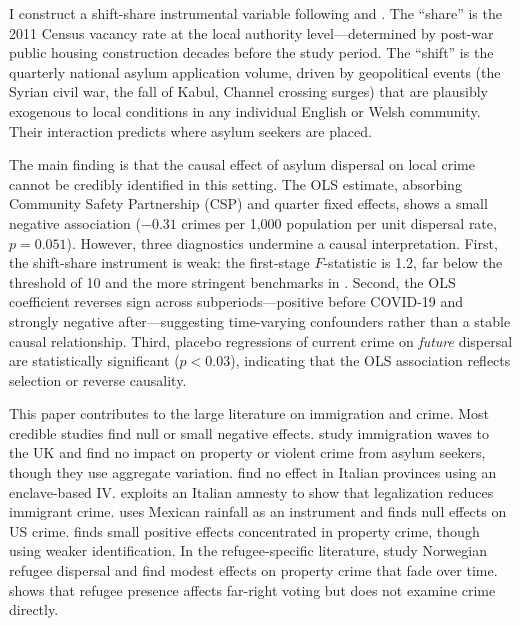 \documentclass[12pt]{article}
\begin{document}
I construct a shift-share instrumental variable following \citet{goldsmith2020bartik} and \citet{borusyak2022quasi}. The ``share'' is the 2011 Census vacancy rate at the local authority level---determined by post-war public housing construction decades before the study period. The ``shift'' is the quarterly national asylum application volume, driven by geopolitical events (the Syrian civil war, the fall of Kabul, Channel crossing surges) that are plausibly exogenous to local conditions in any individual English or Welsh community. Their interaction predicts where asylum seekers are placed.

The main finding is that the causal effect of asylum dispersal on local crime cannot be credibly identified in this setting. The OLS estimate, absorbing Community Safety Partnership (CSP) and quarter fixed effects, shows a small negative association ($-0.31$ crimes per 1,000 population per unit dispersal rate, $p = 0.051$). However, three diagnostics undermine a causal interpretation. First, the shift-share instrument is weak: the first-stage $F$-statistic is 1.2, far below the \citet{staiger1997instrumental} threshold of 10 and the more stringent benchmarks in \citet{lee2022valid}. Second, the OLS coefficient reverses sign across subperiods---positive before COVID-19 and strongly negative after---suggesting time-varying confounders rather than a stable causal relationship. Third, placebo regressions of current crime on \textit{future} dispersal are statistically significant ($p < 0.03$), indicating that the OLS association reflects selection or reverse causality.

This paper contributes to the large literature on immigration and crime. Most credible studies find null or small negative effects. \citet{bell2013crime} study immigration waves to the UK and find no impact on property or violent crime from asylum seekers, though they use aggregate variation. \citet{bianchi2012immigration} find no effect in Italian provinces using an enclave-based IV. \citet{pinotti2017clicking} exploits an Italian amnesty to show that legalization reduces immigrant crime. \citet{chalfin2014criminal} uses Mexican rainfall as an instrument and finds null effects on US crime. \citet{spenkuch2014understanding} finds small positive effects concentrated in property crime, though using weaker identification. In the refugee-specific literature, \citet{dahl2018refugees} study Norwegian refugee dispersal and find modest effects on property crime that fade over time. \citet{steinmayr2021contact} shows that refugee presence affects far-right voting but does not examine crime directly.
\end{document}
